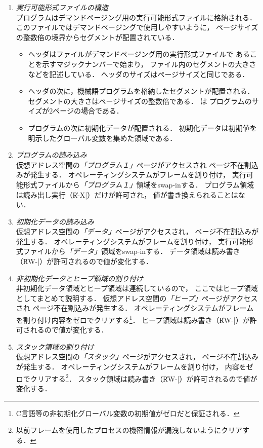 \begin{enumerate}
\item \emph{実行可能形式ファイルの構造} \\
  プログラムはデマンドページング用の実行可能形式ファイルに格納される．
  このファイルではデマンドページングで使用しやすいように，
  ページサイズの整数倍の境界からセグメントが配置されている．
  \begin{itemize}
  \item ヘッダはファイルがデマンドページング用の実行形式ファイルで
    あることを示すマジックナンバーで始まり，
    ファイル内のセグメントの大きさなどを記述している．
    ヘッダのサイズはページサイズと同じである．
  \item ヘッダの次に，機械語プログラムを格納したセグメントが配置される．
    セグメントの大きさはページサイズの整数倍である．
    は
    プログラムのサイズが2ページの場合である．
  \item プログラムの次に初期化データが配置される．
    初期化データは初期値を明示したグローバル変数を集めた領域である．
  \end{itemize}
\item \emph{プログラムの読み込み} \\
  仮想アドレス空間の\emph{「プログラム１」}ページがアクセスされ
  ページ不在割込みが発生する．
  オペレーティングシステムがフレームを割り付け，
  実行可能形式ファイルから\emph{「プログラム１」}領域をswap-inする．
  プログラム領域は読み出し実行（\|R-X|）だけが許可され，
  値が書き換えられることはない．
\item \emph{初期化データの読み込み} \\
  仮想アドレス空間の\emph{「データ」}ページがアクセスされ，
  ページ不在割込みが発生する．
  オペレーティングシステムがフレームを割り付け，
  実行可能形式ファイルから\emph{「データ」}領域をswap-inする．
  データ領域は読み書き（\|RW-|）が許可されるので値が変化する．
\item \emph{非初期化データとヒープ領域の割り付け} \\
  非初期化データ領域とヒープ領域は連続しているので，
  ここではヒープ領域としてまとめて説明する．
  仮想アドレス空間の\emph{「ヒープ」}ページがアクセスされ
  ページ不在割込みが発生する．
  オペレーティングシステムがフレームを割り付け内容をゼロでクリアする\footnote{
  C言語等の非初期化グローバル変数の初期値がゼロだと保証される．}．
  ヒープ領域は読み書き（\|RW-|）が許可されるので値が変化する．
\item \emph{スタック領域の割り付け} \\
  仮想アドレス空間の\emph{「スタック」}ページがアクセスされ，
  ページ不在割込みが発生する．
  オペレーティングシステムがフレームを割り付け，
  内容をゼロでクリアする\footnote{
  以前フレームを使用したプロセスの機密情報が漏洩しないようにクリアする．}．
  スタック領域は読み書き（\|RW-|）が許可されるので値が変化する．
\end{enumerate}

